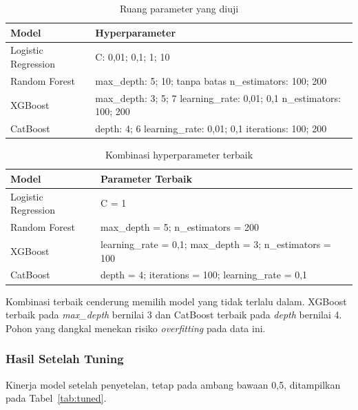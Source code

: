 \begin{table}[H]
\centering
\caption{Ruang parameter yang diuji}
\label{tab:ruang-parameter}
\begin{tabular}{ll}
\toprule
\textbf{Model} & \textbf{Hyperparameter} \\
\midrule
Logistic Regression & C: 0,01; 0,1; 1; 10 \\
Random Forest       & max\_depth: 5; 10; tanpa batas \quad n\_estimators: 100; 200 \\
XGBoost             & max\_depth: 3; 5; 7 \quad learning\_rate: 0,01; 0,1 \quad n\_estimators: 100; 200 \\
CatBoost            & depth: 4; 6 \quad learning\_rate: 0,01; 0,1 \quad iterations: 100; 200 \\
\bottomrule
\end{tabular}
\end{table}

\begin{table}[H]
\centering
\caption{Kombinasi hyperparameter terbaik}
\label{tab:best-params}
\begin{tabular}{ll}
\toprule
\textbf{Model} & \textbf{Parameter Terbaik} \\
\midrule
Logistic Regression & C = 1 \\
Random Forest       & max\_depth = 5; n\_estimators = 200 \\
XGBoost             & learning\_rate = 0,1; max\_depth = 3; n\_estimators = 100 \\
CatBoost            & depth = 4; iterations = 100; learning\_rate = 0,1 \\
\bottomrule
\end{tabular}
\end{table}

Kombinasi terbaik cenderung memilih model yang tidak terlalu dalam. XGBoost terbaik pada \textit{max\_depth} bernilai 3 dan CatBoost terbaik pada \textit{depth} bernilai 4. Pohon yang dangkal menekan risiko \emph{overfitting} pada data ini.

\subsubsection{Hasil Setelah Tuning}
\label{subsec:hasil-tuning}
Kinerja model setelah penyetelan, tetap pada ambang bawaan 0,5, ditampilkan pada Tabel~\ref{tab:tuned}.

